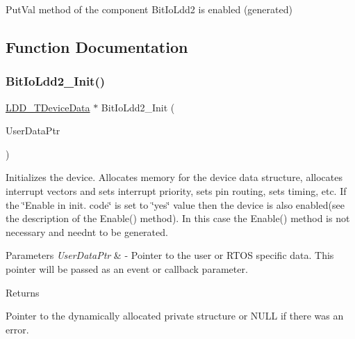 Put\+Val method of the component Bit\+Io\+Ldd2 is enabled (generated) 

\subsection{Function Documentation}
\mbox{\label{group___bit_io_ldd2__module_ga553dbb392db7bc92230a019512a1e5ab}} 
\subsubsection{\texorpdfstring{Bit\+Io\+Ldd2\+\_\+\+Init()}{BitIoLdd2\_Init()}}
{\footnotesize\ttfamily \hyperlink{group___p_e___types__module_gac5cf1362f1f0e3a2ce71b1bf2276d091}{L\+D\+D\+\_\+\+T\+Device\+Data} $\ast$ Bit\+Io\+Ldd2\+\_\+\+Init (\begin{DoxyParamCaption}\item[{\hyperlink{group___p_e___types__module_ga0b66a73f87238a782318aa0be7578e35}{L\+D\+D\+\_\+\+T\+User\+Data} $\ast$}]{User\+Data\+Ptr }\end{DoxyParamCaption})}



Initializes the device. Allocates memory for the device data structure, allocates interrupt vectors and sets interrupt priority, sets pin routing, sets timing, etc. If the \char`\"{}\+Enable
    in init. code\char`\"{} is set to \char`\"{}yes\char`\"{} value then the device is also enabled(see the description of the Enable() method). In this case the Enable() method is not necessary and needn\textquotesingle{}t to be generated. 


\begin{DoxyParams}{Parameters}
{\em User\+Data\+Ptr} & -\/ Pointer to the user or R\+T\+OS specific data. This pointer will be passed as an event or callback parameter. \\
\hline
\end{DoxyParams}
\begin{DoxyReturn}{Returns}

\begin{DoxyItemize}
\item Pointer to the dynamically allocated private structure or N\+U\+LL if there was an error. 
\end{DoxyItemize}
\end{DoxyReturn}
\mbox{\label{group___bit_io_ldd2__module_gaacea30e307e59fc9acf65e01892ad75b}} 
